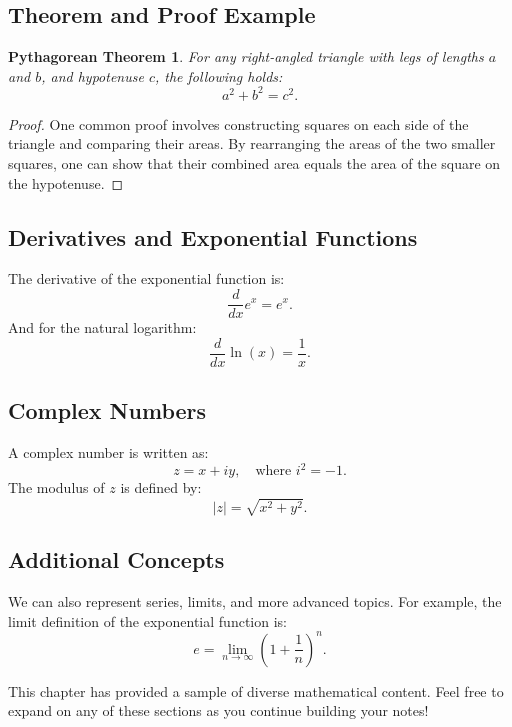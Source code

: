 \subsection{Theorem and Proof Example}

\newtheorem{pythm}{Pythagorean Theorem}

\begin{pythm}
For any right-angled triangle with legs of lengths \(a\) and \(b\), and hypotenuse \(c\), the following holds:
\[
a^2 + b^2 = c^2.
\]
\end{pythm}

\begin{proof}
One common proof involves constructing squares on each side of the triangle and comparing their areas. By rearranging the areas of the two smaller squares, one can show that their combined area equals the area of the square on the hypotenuse.
\end{proof}

\subsection{Derivatives and Exponential Functions}

The derivative of the exponential function is:
\[
\frac{d}{dx} e^x = e^x.
\]
And for the natural logarithm:
\[
\frac{d}{dx}\ln(x) = \frac{1}{x}.
\]

\subsection{Complex Numbers}

A complex number is written as:
\[
z = x + iy, \quad \text{where } i^2 = -1.
\]
The modulus of \(z\) is defined by:
\[
|z| = \sqrt{x^2 + y^2}.
\]

\subsection{Additional Concepts}

We can also represent series, limits, and more advanced topics. For example, the limit definition of the exponential function is:
\[
e = \lim_{n\to\infty}\left(1 + \frac{1}{n}\right)^n.
\]

This chapter has provided a sample of diverse mathematical content. Feel free to expand on any of these sections as you continue building your notes!
